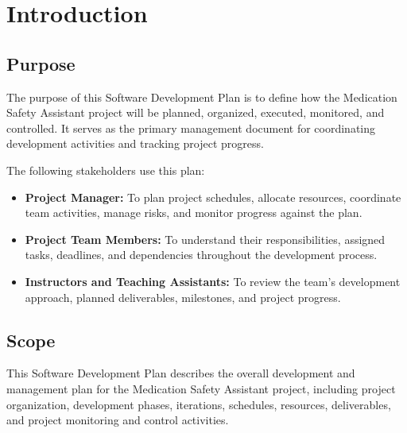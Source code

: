 

\section{Introduction}



\subsection{Purpose}

The purpose of this Software Development Plan is to define
how the Medication Safety Assistant project will be planned,
organized, executed, monitored, and controlled. It serves
as the primary management document for coordinating
development activities and tracking project progress.

The following stakeholders use this plan:

\begin{itemize}

    \item \textbf{Project Manager:}
    To plan project schedules, allocate resources,
    coordinate team activities, manage risks,
    and monitor progress against the plan.

    \item \textbf{Project Team Members:}
    To understand their responsibilities,
    assigned tasks, deadlines, and dependencies
    throughout the development process.

    \item \textbf{Instructors and Teaching Assistants:}
    To review the team's development approach,
    planned deliverables, milestones,
    and project progress.

\end{itemize}



\subsection{Scope}

This Software Development Plan describes the overall
development and management plan for the Medication
Safety Assistant project, including project organization,
development phases, iterations, schedules, resources,
deliverables, and project monitoring and control activities.

